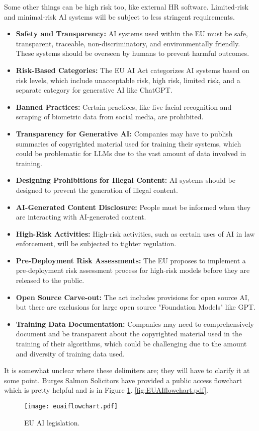 Some other things can be high risk too, like external HR software. Limited-risk and minimal-risk AI systems will be subject to less stringent requirements. 
\begin{itemize}
  \item \textbf{Safety and Transparency:} AI systems used within the EU must be safe, transparent, traceable, non-discriminatory, and environmentally friendly. These systems should be overseen by humans to prevent harmful outcomes.
  \item \textbf{Risk-Based Categories:} The EU AI Act categorizes AI systems based on risk levels, which include unacceptable risk, high risk, limited risk, and a separate category for generative AI like ChatGPT.
  \item \textbf{Banned Practices:} Certain practices, like live facial recognition and scraping of biometric data from social media, are prohibited.
  \item \textbf{Transparency for Generative AI:} Companies may have to publish summaries of copyrighted material used for training their systems, which could be problematic for LLMs due to the vast amount of data involved in training.
  \item \textbf{Designing Prohibitions for Illegal Content:} AI systems should be designed to prevent the generation of illegal content.
  \item \textbf{AI-Generated Content Disclosure:} People must be informed when they are interacting with AI-generated content.
  \item \textbf{High-Risk Activities:} High-risk activities, such as certain uses of AI in law enforcement, will be subjected to tighter regulation.
  \item \textbf{Pre-Deployment Risk Assessments:} The EU proposes to implement a pre-deployment risk assessment process for high-risk models before they are released to the public.
  \item \textbf{Open Source Carve-out:} The act includes provisions for open source AI, but there are exclusions for large open source "Foundation Models" like GPT.
  \item \textbf{Training Data Documentation:} Companies may need to comprehensively document and be transparent about the copyrighted material used in the training of their algorithms, which could be challenging due to the amount and diversity of training data used.
\end{itemize}

It is somewhat unclear where these delimiters are; they will have to clarify it at some point. Burges Salmon Solicitors have provided a public access flowchart which is pretty helpful and is in Figure \ref{fig:euaiflowchart}.
\ref{fig:EUAIflowchart.pdf}. 
\begin{figure}[H]
    \centering
    \texttt{[image: euaiflowchart.pdf]}
    \caption{EU AI legislation.}
    \label{fig:euaiflowchart}
\end{figure}


